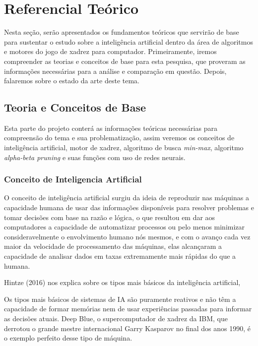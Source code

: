 \chapter{Referencial Teórico}
Nesta seção, serão apresentados os fundamentos teóricos que servirão de base para sustentar o estudo sobre a inteligência
artificial dentro da área de algoritmos e motores do jogo de xadrez para computador. Primeiramente, iremos compreender as
teorias e conceitos de base para esta pesquisa, que proveram as informações necessárias para a análise e comparação em questão.
Depois, falaremos sobre o estado da arte deste tema.

\section{Teoria e Conceitos de Base}
Esta parte do projeto conterá as informações teóricas necessárias para compreensão do tema e sua problematização,
assim veremos os conceitos de inteligência artificial, motor de xadrez, algoritmo de busca \textit{min-max},
algoritmo \textit{alpha-beta pruning} e suas funções com uso de redes neurais.

\subsection{Conceito de Inteligencia Artificial}
O conceito de inteligência artificial surgiu da ideia de reproduzir nas máquinas a capacidade humana de usar das informações
disponíveis para resolver problemas e tomar decisões com base na razão e lógica, o que resultou em dar aos computadores a
capacidade de automatizar processos ou pelo menos minimizar consideravelmente o envolvimento humano nós mesmos,
e com o avanço cada vez maior da velocidade de processamento das máquinas, elas alcançaram a capacidade de analisar dados
em taxas extremamente mais rápidas do que a humana.

Hintze (2016) nos explica sobre os tipos mais básicos da inteligência artificial,
\begin{citacao}
    Os tipos mais básicos de sistemas de IA são puramente reativos e não têm a capacidade de formar memórias nem de usar
    experiências passadas para informar as decisões atuais. Deep Blue, o supercomputador de xadrez da IBM, que derrotou o
    grande mestre internacional Garry Kasparov no final dos anos 1990, é o exemplo perfeito desse tipo de máquina.
    \cite[tradução nossa.]{HINTZE}
\end{citacao}

